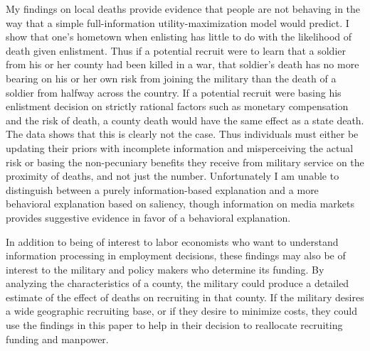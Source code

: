 \documentclass[12pt] {article}
\begin{document}

 

My findings on local deaths provide evidence that people
are not behaving in the way that a simple full-information utility-maximization
model would predict. I show that one's hometown when enlisting has
little to do with the likelihood of death given enlistment. Thus if
a potential recruit were to learn that a soldier from his or her
county had been killed in a war, that soldier's death has no more
bearing on his or her own risk from joining the military than the
death of a soldier from halfway across the country. If a potential
recruit were basing his enlistment decision on strictly rational factors such
as monetary compensation and the risk of death, a county death would
have the same effect as a state death. The data shows that this is
clearly not the case. Thus individuals must either be updating their
priors with incomplete information and misperceiving the actual risk
or basing the non-pecuniary benefits they receive from military service
on the proximity of deaths, and not just the number. Unfortunately I am unable to distinguish between a purely information-based explanation and a more behavioral explanation based on saliency, though information on media markets provides suggestive evidence in favor of a behavioral explanation.

In addition to being of interest to labor economists who want to understand information processing in employment decisions, these findings may also be of interest to the military and policy makers who determine its funding. By analyzing the characteristics
of a county, the military could produce a detailed estimate of the
effect of deaths on recruiting in that county. If the military desires
a wide geographic recruiting base, or if they desire to minimize costs,
they could use the findings in this paper to help in their decision
to reallocate recruiting funding and manpower. 
\end{document}
